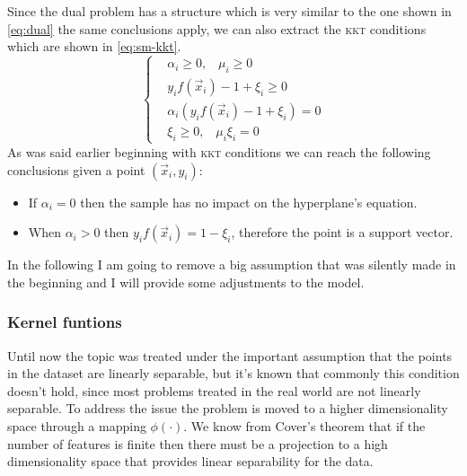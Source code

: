 Since the dual problem has a structure which is very similar to the one shown in \cref{eq:dual} the
same conclusions apply, we can also extract the \textsc{kkt} conditions which are shown in
\cref{eq:sm-kkt}.
\begin{equation}
	\label{eq:sm-kkt}
	\begin{cases}
		& \alpha_i \geq 0, \hspace{10pt}\mu_i \geq 0 \\
		 & y_if(\vec{x}_i) - 1 + \xi_i \geq 0 \\
		 & \alpha_i(y_if(\vec{x}_i) - 1 + \xi_i) = 0 \\
		 & \xi_i \geq 0, \hspace{10pt} \mu_i\xi_i = 0
	\end{cases}
\end{equation}
As was said earlier beginning with \textsc{kkt} conditions we can reach the following conclusions
given a point $(\vec{x}_i, y_i)$:
\begin{itemize}
	\item If $\alpha_i = 0$ then the sample has no impact on the hyperplane's equation.
	\item When $\alpha_i > 0$ then $y_if(\vec{x}_i) = 1 - \xi_i$, therefore the point is a
		support vector.
\end{itemize}

In the following I am going to remove a big assumption that was silently made in the beginning and I
will provide some adjustments to the model.

\subsubsection{Kernel funtions}
\label{sssec:kernel-functions}
Until now the topic was treated under the important assumption that the points in the dataset are
linearly separable, but it's known that commonly this condition doesn't hold, since most problems
treated in the real world are not linearly separable. To address the issue the
problem is moved to a higher dimensionality space through a mapping $\phi(\cdot)$. We know from
Cover's theorem \cite{cover1965} that if the number of features is finite then there must be a
projection to a high dimensionality space that provides linear separability for the data.

